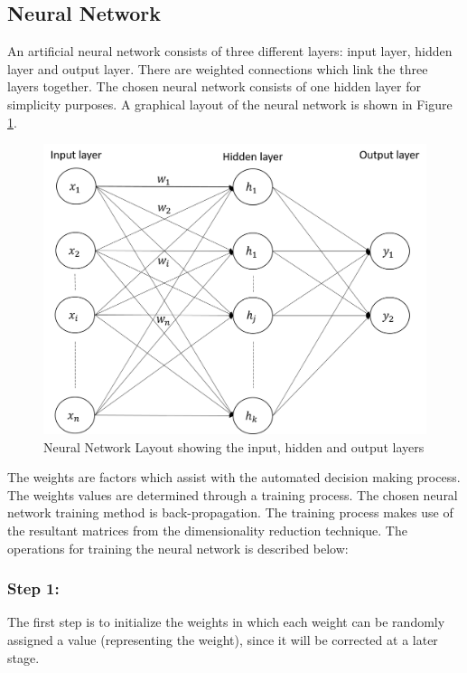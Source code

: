 \documentclass[11pt]{article}
\begin{document}
	\subsection{Neural Network}
	An artificial neural network consists of three different layers: input layer, hidden layer and output layer. There are weighted connections which link the three layers together. The chosen neural network consists of one hidden layer for simplicity purposes. 
	A graphical layout of the neural network is shown in Figure \ref{fig: neural_network}.
	\begin{figure}[!h]
		\centering
		\includegraphics[scale=0.45]{neural_network.png}
		\caption{Neural Network Layout showing the input, hidden and output layers}
		\label{fig: neural_network}
	\end{figure}
	
	The weights are factors which assist with the automated decision making process. The weights values are determined through a training process. The chosen neural network training method is back-propagation. The training process makes use of the resultant matrices from the dimensionality reduction technique. The operations for training the neural network is described below:
	
	\subsubsection{Step 1:} 
	The first step is to initialize the weights in which each weight can be randomly assigned a value (representing the weight), since it will be corrected at a later stage.
	
\end{document}
